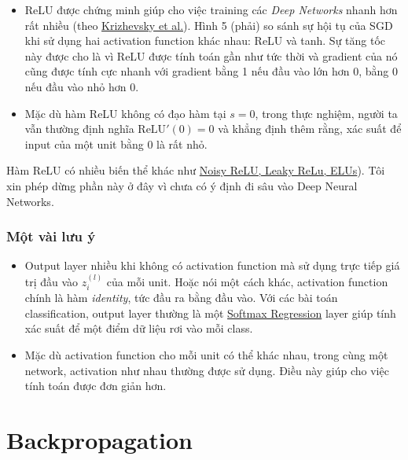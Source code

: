 \begin{itemize}
    \item ReLU được chứng minh giúp cho việc training các \textit{Deep Networks} nhanh hơn rất nhiều (theo \href{http://www.cs.toronto.edu/~fritz/absps/imagenet.pdf}{Krizhevsky et al.}). Hình 5 (phải) so sánh sự hội tụ của SGD khi sử dụng hai activation function khác nhau: ReLU và tanh. Sự tăng tốc này được cho là vì ReLU được tính toán gần như tức thời và gradient của nó cũng được tính cực nhanh với gradient bằng 1 nếu đầu vào lớn hơn 0, bằng 0 nếu đầu vào nhỏ hơn 0. 
     
    \item Mặc dù hàm ReLU không có đạo hàm tại $s = 0$, trong thực nghiệm, người ta vẫn thường định nghĩa $\text{ReLU}'(0) = 0$ và khẳng định thêm rằng, xác suất để input của một unit bằng 0 là rất nhỏ. 
 
\end{itemize}
 
Hàm ReLU có nhiều biến thể khác như \href{https://en.wikipedia.org/wiki/Rectifier_(neural_networks}{Noisy ReLU, Leaky ReLu, ELUs}). Tôi xin phép dừng phần này ở đây vì chưa có ý định đi sâu vào Deep Neural Networks. 
 
 
\subsubsection{Một vài lưu ý}

\begin{itemize}
    \item Output layer nhiều khi không có activation function mà sử dụng trực tiếp giá trị đầu vào $z_i^{(l)}$ của mỗi unit. Hoặc nói một cách khác, activation function chính là hàm \textit{identity}, tức đầu ra bằng đầu vào. Với các bài toán classification, output layer thường là một \href{http://machinelearningcoban.com/2017/02/17/softmax/}{Softmax Regression} layer giúp tính xác suất để một điểm dữ liệu rơi vào mỗi class. 
 
    \item Mặc dù activation function cho mỗi unit có thể khác nhau, trong cùng một network, activation như nhau thường được sử dụng. Điều này giúp cho việc tính toán được đơn giản hơn. 
\end{itemize}
 
 
 
\section{Backpropagation}

